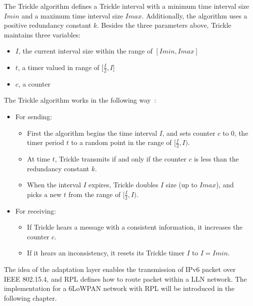 The Trickle algorithm defines a Trickle interval with a minimum time interval size $Imin$ and a maximum time interval size $Imax$. Additionally, the algorithm uses a positive redundancy constant $k$. Besides the three parameters above, Trickle maintains three variables:
\begin{itemize}
 \item $I$, the current interval size within the range of $[Imin, Imax]$
 
 \item $t$, a timer valued in range of [$\frac{I}{2}, I$]
 
 \item $c$, a counter
\end{itemize}

The Trickle algorithm works in the following way~\cite{RFC 6206}:
\begin{itemize}
\item For sending:
  \begin{itemize}
  \item First the algorithm begins the time interval $I$, and sets counter $c$ to 0, the timer period $t$ to a random point in the range of $[\frac{I}{2}, I)$.
  
  \item At time $t$, Trickle transmits if and only if the counter $c$ is less than the redundancy constant $k$.
  
  \item When the interval $I$ expires, Trickle doubles $I$ size (up to $Imax$), and picks a new $t$ from the range of $[\frac{I}{2}, I)$. 
  \end{itemize}  
  
\item For receiving:
 \begin{itemize}
 \item If Trickle hears a message with a consistent information, it increases the counter $c$.
 
 \item If it hears an inconsistency, it resets its Trickle timer $I$ to $I=Imin$.
 \end{itemize}
\end{itemize}


The idea of the adaptation layer enables the transmission of IPv6 packet over IEEE 802.15.4, and RPL defines how to route packet within a LLN network. The implementation for a 6LoWPAN network with RPL will be introduced in the following chapter.






